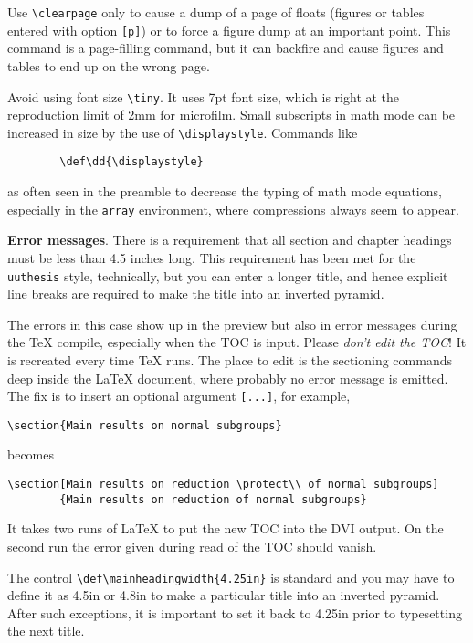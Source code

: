Use \verb"\clearpage" only to cause a dump of a page of floats (figures
or tables entered with option \verb"[p]") or to force a figure dump at
an important point. This command is a page-filling command, but it can
backfire and cause figures and tables to end up on the wrong page.

Avoid using font size \verb|\tiny|. It uses 7pt font size, which is
right at the reproduction limit of 2mm for microfilm. Small subscripts
in math mode can be increased in size by the use of
\verb"\displaystyle". Commands like

\verb"        \def\dd{\displaystyle}"

as often seen in the preamble to decrease the typing of math mode
equations, especially in the {\tt array} environment, where compressions
always seem to appear.

{\bf Error messages}.
There is a requirement that all section and chapter headings must be
less than 4.5 inches long.  This requirement has been met for the
\verb|uuthesis| style, technically, but you can enter a longer title,
and hence explicit line breaks are required to make the title into an
inverted pyramid.

The errors in this case show up in the preview but also in error
messages during the \TeX{} compile, especially when the TOC is input.
Please {\em don't edit the TOC}! It is recreated every time \TeX{} runs.
The place to edit is the sectioning commands deep inside the \LaTeX{}
document, where probably no error message is emitted. The fix is to
insert an optional argument \verb"[...]", for example,

\verb"\section{Main results on normal subgroups}"

becomes

\verb"\section[Main results on reduction \protect\\ of normal subgroups]"\\
\verb"        {Main results on reduction of normal subgroups}"

It takes two runs of \LaTeX{} to put the new TOC into the DVI output. On
the second run the error given during read of the TOC should vanish.

The control \verb"\def\mainheadingwidth{4.25in}" is standard and you
may have to define it as 4.5in or 4.8in to make a particular title into
an inverted pyramid. After such exceptions, it is important to set it
back to 4.25in prior to typesetting the next title.

